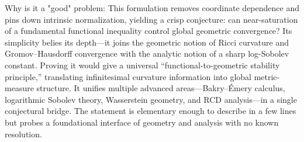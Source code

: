 Why is it a "good" problem:  
This formulation removes coordinate dependence and pins down intrinsic normalization, yielding a crisp conjecture: can near-saturation of a fundamental functional inequality control global geometric convergence? Its simplicity belies its depth—it joins the geometric notion of Ricci curvature and Gromov–Hausdorff convergence with the analytic notion of a sharp log-Sobolev constant. Proving it would give a universal “functional-to-geometric stability principle,” translating infinitesimal curvature information into global metric-measure structure. It unifies multiple advanced areas—Bakry–Émery calculus, logarithmic Sobolev theory, Wasserstein geometry, and RCD analysis—in a single conjectural bridge. The statement is elementary enough to describe in a few lines but probes a foundational interface of geometry and analysis with no known resolution.